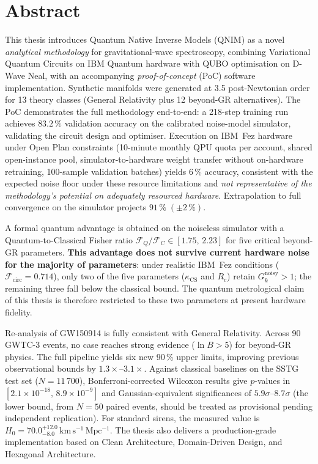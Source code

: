 \documentclass[11pt,a4paper, english]{book}
\theoremstyle{plain}
\theoremstyle{definition}
\numberwithin{equation}{chapter}
\numberwithin{figure}{chapter}
\numberwithin{table}{chapter}
\begin{document}
\chapter*{Abstract}
This thesis introduces Quantum Native Inverse Models (QNIM) as a novel
\emph{analytical methodology} for gravitational-wave spectroscopy,
combining Variational Quantum Circuits on IBM Quantum hardware with QUBO
optimisation on D-Wave Neal, with an accompanying \emph{proof-of-concept}
(PoC) software implementation. Synthetic manifolds were generated at
3.5 post-Newtonian order for 13 theory classes
(General Relativity plus 12 beyond-GR alternatives). 
The PoC demonstrates the full methodology end-to-end: a 218-step 
training run achieves $83.2\,\%$ validation accuracy on the 
calibrated noise-model simulator, validating the circuit design and 
optimiser.  Execution on IBM~Fez hardware under Open Plan constraints 
(10-minute monthly QPU quota per account, shared open-instance pool,
simulator-to-hardware weight transfer without on-hardware retraining,
100-sample validation batches) yields 
$6\,\%$ accuracy, consistent with the expected noise floor under these 
resource limitations and \emph{not representative of the methodology's 
potential on adequately resourced hardware}.
Extrapolation to full convergence on the simulator projects
$91\,\%\;(\pm2\,\%)$.

A formal quantum advantage is obtained on the noiseless simulator with
a Quantum-to-Classical Fisher ratio
$\mathcal{F}_Q/\mathcal{F}_C \in [1.75,\,2.23]$ for five critical
beyond-GR parameters. \textbf{This advantage does not survive current
hardware noise for the majority of parameters}: under realistic IBM~Fez
conditions ($\mathcal{F}_\mathrm{circ}=0.714$), only two of the five
parameters ($\kappa_\mathrm{CS}$ and $R_c$) retain $G_k^\mathrm{noisy}>1$;
the remaining three fall below the classical bound. The quantum
metrological claim of this thesis is therefore restricted to these two
parameters at present hardware fidelity.

Re-analysis of GW150914 is fully consistent with General Relativity.
Across 90 GWTC-3 events, no case reaches strong evidence
($\ln B>5$) for beyond-GR physics. The full pipeline yields six new
90\,\% upper limits, improving previous observational bounds by
$1.3\times$--$3.1\times$. Against classical baselines on the SSTG test set
($N=11\,700$), Bonferroni-corrected Wilcoxon results give
$p$-values in $[2.1\times10^{-18},\,8.9\times10^{-9}]$ and
Gaussian-equivalent significances of $5.9\sigma$--$8.7\sigma$ (the
lower bound, from $N=50$ paired events, should be treated as
provisional pending independent replication).
For standard sirens, the measured value is
$H_0=70.0^{+12.0}_{-8.0}\,\mathrm{km\,s^{-1}\,Mpc^{-1}}$.
The thesis also delivers a production-grade implementation based on
Clean Architecture, Domain-Driven Design, and Hexagonal Architecture.
\end{document}
